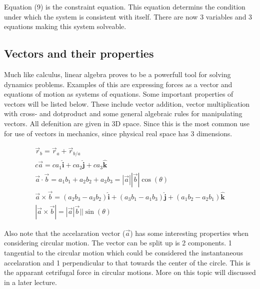 \documentclass[11pt, a4paper]{article}
\begin{document}
Equation (9) is the constraint equation. This equation determins the condition under which
the system is consistent with itself. There are now 3 variables and 3 equations making this system solveable.

\subsection{Vectors and their properties}
Much like calculus, linear algebra proves to be a powerfull tool for solving dynamics problems.
Examples of this are expressing forces as a vector and equations of motion as systems of equations.
Some important properties of vectors will be listed below. These include vector addition, vector multiplication 
with cross- and dotproduct and some general algebraic rules for manipulating vectors. All defenition are given in 3D space.
Since this is the most common use for use of vectors in mechanics, since physical real space has 3 dimensions.

\setcounter{equation}{0}
\begin{gather}
    \vec{r}_b = \vec{r}_a + \vec{r}_{b/a} \\
    c \vec{a} = ca_1\boldsymbol{\hat{i}} + ca_2\boldsymbol{\hat{j}} + ca_3\boldsymbol{\hat{k}}\\
    \vec{a} \cdot \vec{b} = a_1 b_1 + a_2 b_2 + a_3 b_3 = |\vec{a}||\vec{b}|\cos(\theta)\\
    \vec{a} \times \vec{b} = (a_2 b_3 - a_3b_2) \boldsymbol{\hat{i}} + (a_3 b_1 - a_1 b_3)\boldsymbol{\hat{j}} + (a_1 b_2 - a_2 b_1)\boldsymbol{\hat{k}}\\
    |\vec{a} \times \vec{b}| = |\vec{a}|\vec{b}||\sin(\theta)
\end{gather}

Also note that the accelaration vector ($\vec{a}$) has some interesting properties when considering
circular motion. The vector can be split up is 2 components. 1 tangential to the circular motion
which could be considered the instantaneous accelaration and 1 perpendicular to that towards the center
of the circle. This is the apparant cetrifugal force in circular motions. More on this topic will 
discussed in a later lecture.
\newpage
\end{document}
